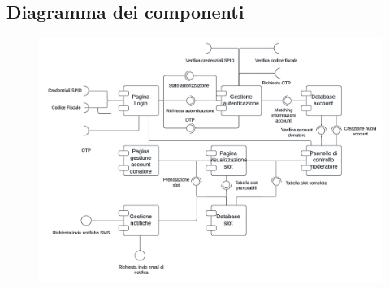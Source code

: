\documentclass{article}
\begin{document}
\subsection{Diagramma dei componenti}

\begin{figure}[htp]
		\centering
		\includegraphics[width=\textwidth]{interface.png}
	\end{figure}
\end{document}
